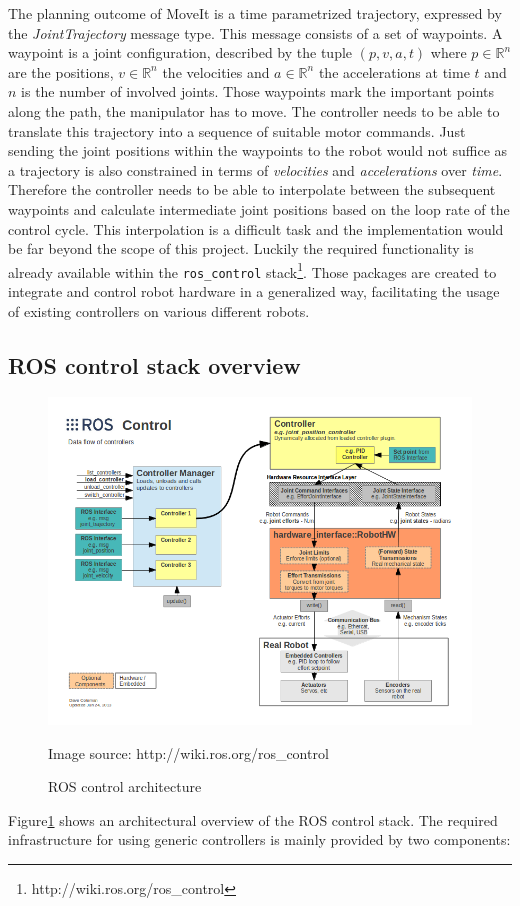 The planning outcome of MoveIt is a time parametrized trajectory, expressed by the \emph{JointTrajectory} message type. This message consists of a set of waypoints. A waypoint is a joint configuration, described by the tuple $(p,v,a,t)$ where $p \in \mathbb{R}^n$ are the positions, $v \in \mathbb{R}^n$ the velocities and $a \in \mathbb{R}^n$ the accelerations at time $t$ and $n$ is the number of involved joints. Those waypoints mark the important points along the path, the manipulator has to move. The controller needs to be able to translate this trajectory into a sequence of suitable motor commands. Just sending the joint positions within the waypoints to the robot would not suffice as a trajectory is also constrained in terms of \emph{velocities} and \emph{accelerations} over \emph{time}. Therefore the controller needs to be able to interpolate between the subsequent waypoints and calculate intermediate joint positions based on the loop rate of the control cycle. This interpolation is a difficult task and the implementation would be far beyond the scope of this project. Luckily the required functionality is already available within the \texttt{ros\_control} stack\footnote{http://wiki.ros.org/ros\_control}. Those packages are created to integrate and control robot hardware in a generalized way, facilitating the usage of existing controllers on various different robots. 

\subsection{ROS control stack overview}

\begin{figure}
	\centering
  	\includegraphics[width=1.0\textwidth]{images/ros_control.png}
	\caption{ROS control architecture}
	{\scriptsize Image source: http://wiki.ros.org/ros\_control}
	\label{fig:ros_control}
\end{figure}
Figure\ref{fig:ros_control} shows an architectural overview of the ROS control stack. The required infrastructure for using generic controllers is mainly provided by two components:

